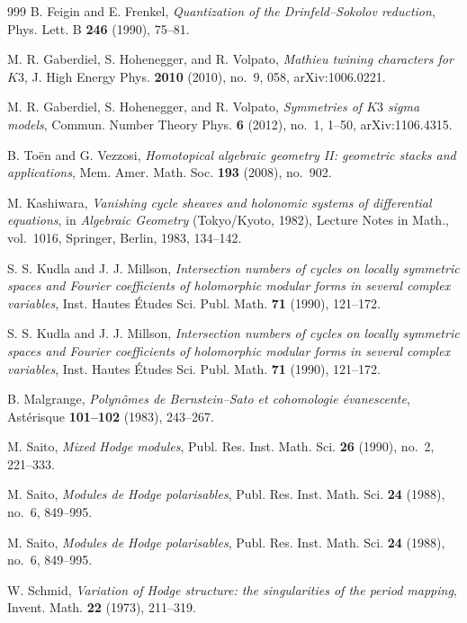\begin{thebibliography}{999}
B. Feigin and E. Frenkel, \emph{Quantization of the Drinfeld--Sokolov reduction}, Phys. Lett. B \textbf{246} (1990), 75--81.

M. R. Gaberdiel, S. Hohenegger, and R. Volpato, \emph{Mathieu twining characters for $K3$}, J. High Energy Phys. \textbf{2010} (2010), no.~9, 058, arXiv:1006.0221.

M. R. Gaberdiel, S. Hohenegger, and R. Volpato, \emph{Symmetries of $K3$ sigma models}, Commun. Number Theory Phys. \textbf{6} (2012), no.~1, 1--50, arXiv:1106.4315.

B. To\"en and G. Vezzosi, \emph{Homotopical algebraic geometry II: geometric stacks and applications}, Mem. Amer. Math. Soc. \textbf{193} (2008), no.~902.

M. Kashiwara, \emph{Vanishing cycle sheaves and holonomic systems of differential equations}, in \emph{Algebraic Geometry} (Tokyo/Kyoto, 1982), Lecture Notes in Math., vol.~1016, Springer, Berlin, 1983, 134--142.

S. S. Kudla and J. J. Millson, \emph{Intersection numbers of cycles on locally symmetric spaces and Fourier coefficients of holomorphic modular forms in several complex variables}, Inst. Hautes \'Etudes Sci. Publ. Math. \textbf{71} (1990), 121--172.

S. S. Kudla and J. J. Millson, \emph{Intersection numbers of cycles on locally symmetric spaces and Fourier coefficients of holomorphic modular forms in several complex variables}, Inst. Hautes \'Etudes Sci. Publ. Math. \textbf{71} (1990), 121--172.

B. Malgrange, \emph{Polyn\^omes de Bernstein--Sato et cohomologie \'evanescente}, Ast\'erisque \textbf{101--102} (1983), 243--267.

M. Saito, \emph{Mixed Hodge modules}, Publ. Res. Inst. Math. Sci. \textbf{26} (1990), no.~2, 221--333.

M. Saito, \emph{Modules de Hodge polarisables}, Publ. Res. Inst. Math. Sci. \textbf{24} (1988), no.~6, 849--995.

M. Saito, \emph{Modules de Hodge polarisables}, Publ. Res. Inst. Math. Sci. \textbf{24} (1988), no.~6, 849--995.

W. Schmid, \emph{Variation of Hodge structure: the singularities of the period mapping}, Invent. Math. \textbf{22} (1973), 211--319.


\end{thebibliography}
